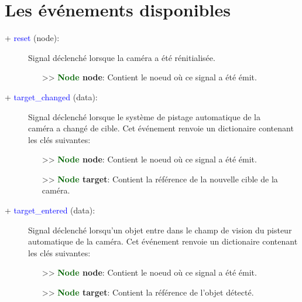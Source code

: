 \documentclass[a4paper, 11pt]{article}
\begin{document}
	\section{Les événements disponibles}
	\begin{description}
		\item [+ \textcolor{blue}{reset} (node):] Signal déclenché lorsque la caméra a été rénitialisée.
		\begin{itemize}
			\item [>> \textbf{\textcolor{darkgreen}{Node} node}:] Contient le noeud où ce signal a été émit.
			\\
		\end{itemize}
	\end{description}
	\begin{description}
		\item [+ \textcolor{blue}{target\_changed} (data):] Signal déclenché lorsque le système de pistage
		automatique de la \\caméra a changé de cible. Cet événement renvoie un dictionaire contenant les 
		clés suivantes:
		\begin{itemize}
			\item [>> \textbf{\textcolor{darkgreen}{Node} node}:] Contient le noeud où ce signal a été émit.
			\item [>> \textbf{\textcolor{darkgreen}{Node} target}:] Contient la référence de la nouvelle 
			cible de la caméra.\\
		\end{itemize}
	\end{description}
	\begin{description}
		\item [+ \textcolor{blue}{target\_entered} (data):] Signal déclenché lorsqu'un objet entre dans le 
		champ de vision du pisteur automatique de la caméra. Cet événement renvoie un dictionaire contenant 
		les clés suivantes:
		\begin{itemize}
			\item [>> \textbf{\textcolor{darkgreen}{Node} node}:] Contient le noeud où ce signal a été émit.
			\item [>> \textbf{\textcolor{darkgreen}{Node} target}:] Contient la référence de l'objet 
			détecté.\\
		\end{itemize}
	\end{description}
\end{document}
